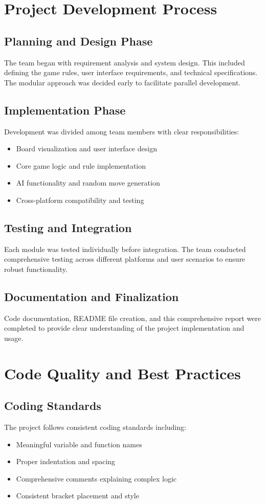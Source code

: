 \documentclass[12pt]{article}
\begin{document}
\section{Project Development Process}

\subsection{Planning and Design Phase}
The team began with requirement analysis and system design. This included defining the game rules, user interface requirements, and technical specifications. The modular approach was decided early to facilitate parallel development.

\subsection{Implementation Phase}
Development was divided among team members with clear responsibilities:
\begin{itemize}
    \item Board visualization and user interface design
    \item Core game logic and rule implementation
    \item AI functionality and random move generation
    \item Cross-platform compatibility and testing
\end{itemize}

\subsection{Testing and Integration}
Each module was tested individually before integration. The team conducted comprehensive testing across different platforms and user scenarios to ensure robust functionality.

\subsection{Documentation and Finalization}
Code documentation, README file creation, and this comprehensive report were completed to provide clear understanding of the project implementation and usage.

\section{Code Quality and Best Practices}

\subsection{Coding Standards}
The project follows consistent coding standards including:
\begin{itemize}
    \item Meaningful variable and function names
    \item Proper indentation and spacing
    \item Comprehensive comments explaining complex logic
    \item Consistent bracket placement and style
\end{itemize}
\end{document}
